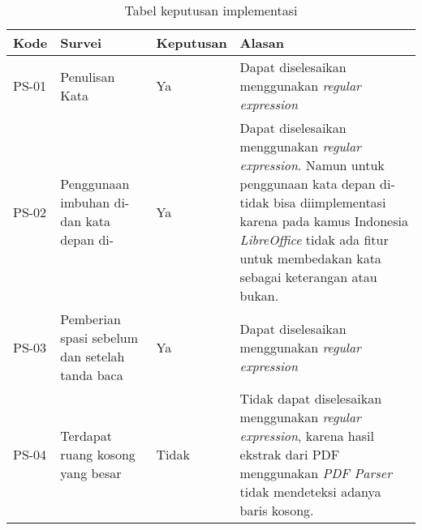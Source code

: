 \begin{table}[H]
	\caption {Tabel keputusan implementasi} \label{tab:keputusan}
	\begin{center}
		\begin{tabular}{|p{1.5 cm}|>{\raggedright} p{4 cm}| p{2 cm}| p{7 cm}|}
		\hline
		Kode & Survei & Keputusan & Alasan \\ 
		\hline 
		PS-01 & Penulisan Kata & Ya & Dapat diselesaikan menggunakan \textit{regular expression} \newline \\ 
		\hline 
		PS-02 & Penggunaan imbuhan di- dan kata depan di- & Ya & Dapat diselesaikan menggunakan \textit{regular expression}. Namun untuk penggunaan kata depan di- tidak bisa diimplementasi karena pada kamus Indonesia \textit{LibreOffice} tidak ada fitur untuk membedakan kata sebagai keterangan atau bukan. \newline \\ 
		\hline 
		PS-03 & Pemberian spasi sebelum dan setelah tanda baca & Ya & Dapat diselesaikan menggunakan \textit{regular expression} \newline \\ 
		\hline 
		PS-04 & Terdapat ruang kosong yang besar & Tidak & Tidak dapat diselesaikan menggunakan \textit{regular expression}, karena hasil ekstrak dari PDF menggunakan \textit{PDF Parser} tidak mendeteksi adanya baris kosong. \newline \\ 
		\hline 
		\end{tabular}
	\end{center}
\end{table}

